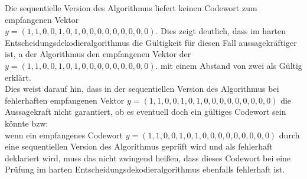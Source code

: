 \begin{Beispiel}
    Die sequentielle Version des Algorithmus liefert keinen Codewort zum empfangenen Vektor\\
    $y = (1,1,0,0,1,0,1,0,0,0,0,0,0,0,0,0)$. 
    Dies zeigt deutlich, dass im harten Entscheidungsdekodieralgorithmus die Gültigkeit für diesen Fall aussagekräftiger ist, a der Algorithmus den empfangenen Vektor der $y = (1,1,0,0,1,0,1,0,0,0,0,0,0,0,0,0)$.
    mit einem Abstand von zwei als Gültig erklärt.\\
    
    Dies weist darauf hin, dass in der sequentiellen Version des Algorithmus bei fehlerhaften empfangenen Vektor $y = (1,1,0,0,1,0,1,0,0,0,0,0,0,0,0,0)$ die Aussagekraft nicht garantiert, 
    ob es eventuell doch ein gültiges Codewort sein könnte bzw:\\
    
    wenn ein empfangenes Codewort $y = (1,1,0,0,1,0,1,0,0,0,0,0,0,0,0,0)$ durch eine sequentiellen Version des Algorithmus 
    geprüft wird und als fehlerhaft deklariert wird, 
    muss das nicht zwingend hei\ss{}en, dass dieses Codewort bei eine Prüfung im harten Entscheidungsdekodieralgorithmus ebenfalls fehlerhaft ist.\\
    \pagebreak
    
\end{Beispiel}



